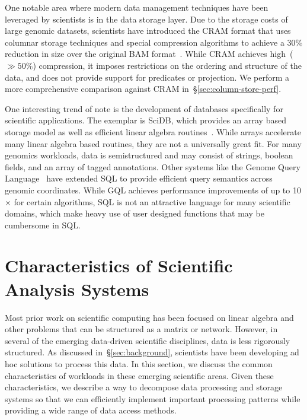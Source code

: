 \documentclass{acm_proc_article-sp}
\begin{document}
One notable area where modern data management techniques have been leveraged by scientists is in
the data storage layer. Due to the storage costs of large genomic datasets, scientists have introduced the
CRAM format that uses columnar storage techniques and special compression algorithms to achieve a
30\% reduction in size over the original BAM format~\cite{fritz11}. While CRAM achieves high~($\gg 50\%$)
compression, it imposes restrictions on the ordering and structure of the data, and does not provide
support for predicates or projection. We perform a more comprehensive comparison against CRAM
in~\S\ref{sec:column-store-perf}.

One interesting trend of note is the development of databases specifically for scientific applications.
The exemplar is \linebreak SciDB, which provides an array based storage model as well as efficient
linear algebra routines~\cite{brown10}. While arrays accelerate many linear algebra based routines, they
are not a universally great fit. For many genomics workloads, data is semistructured and may consist of
strings, boolean fields, and an array of tagged annotations. Other systems like the Genome Query
Language~\cite{kozanitis14} have extended SQL to provide efficient query semantics across genomic
coordinates. While GQL achieves performance improvements of up to 10$\times$ for certain algorithms,
SQL is not an attractive language for many scientific domains, which make heavy use of user designed
functions that may be cumbersome in SQL.

\pagebreak

\section{Characteristics of Scientific \\ Analysis Systems}
\label{sec:principles}

Most prior work on scientific computing has been focused on linear algebra and other problems that can
be structured as a matrix or network. However, in several of the emerging data-driven scientific
disciplines, data is less rigorously structured. As discussed
in~\S\ref{sec:background}, scientists have been developing ad hoc solutions to process this data. In this
section, we discuss the common characteristics of workloads in these emerging scientific areas. Given
these characteristics, we describe a way to decompose data processing and storage systems so that
we can efficiently implement important processing patterns while providing a wide range of data access
methods.
\end{document}

